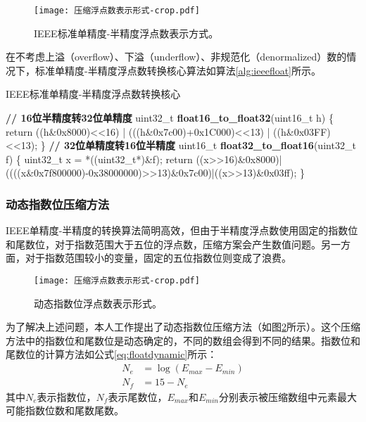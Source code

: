 \begin{figure}[ht]
\centering
\texttt{[image: 压缩浮点数表示形式-crop.pdf]}
\caption{IEEE标准单精度-半精度浮点数表示方式。}
\label{fig:ieeefloathalf}
\end{figure}

在不考虑上溢（overflow）、下溢（underflow）、非规范化（denormalized）数的情况下，标准单精度-半精度浮点数转换核心算法如算法\ref{alg:ieeefloat}所示。
\begin{algorithm}[ht]
\small
\caption{IEEE标准单精度-半精度浮点数转换核心}\label{alg:ieeefloat}
\begin{algorithmic}[1]
\State \textbf{// 16位半精度转32位单精度}
\State uint32\_t \textbf{float16\_to\_float32}(uint16\_t h) \{
\State \quad\quad return ((h\&0x8000)<<16) | (((h\&0x7c00)+0x1C000)<<13) | ((h\&0x03FF)<<13);
\State \}
\State
\State \textbf{// 32位单精度转16位半精度}
\State uint16\_t \textbf{float32\_to\_float16}(uint32\_t f) \{
\State \quad\quad uint32\_t x = *((uint32\_t*)\&f);
\State \quad\quad return ((x>>16)\&0x8000)|((((x\&0x7f800000)-0x38000000)>>13)\&0x7c00)|((x>>13)\&0x03ff);
\State \}
\end{algorithmic}
\end{algorithm}

\subsubsection{动态指数位压缩方法}
IEEE单精度-半精度的转换算法简明高效，但由于半精度浮点数使用固定的指数位和尾数位，对于指数范围大于五位的浮点数，压缩方案会产生数值问题。另一方面，对于指数范围较小的变量，固定的五位指数位则变成了浪费。

\begin{figure}[ht]
\centering
\texttt{[image: 压缩浮点数表示形式-crop.pdf]}
\caption{动态指数位浮点数表示形式。}
\label{fig:ieeefloatdynamic}
\end{figure}

为了解决上述问题，本人工作提出了动态指数位压缩方法（如图\ref{fig:ieeefloatdynamic}所示）。这个压缩方法中的指数位和尾数位是动态确定的，不同的数组会得到不同的结果。指数位和尾数位的计算方法如公式\ref{eq:floatdynamic}所示：
\begin{equation}
  \begin{aligned}
    N_e &= \log(E_{max} - E_{min}) \\
    N_f &= 15 - N_e
  \end{aligned}
  \label{eq:floatdynamic}
\end{equation}
其中$N_e$表示指数位，$N_f$表示尾数位，$E_{max}$和$E_{min}$分别表示被压缩数组中元素最大可能指数位数和尾数尾数。


